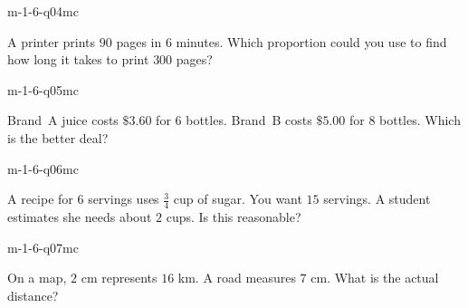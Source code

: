 \begin{practiceQuestion}{m-1-6-q04}{mc}
\begin{questionText}
A printer prints $90$ pages in $6$ minutes. Which proportion could you use to find how long it takes to print $300$ pages?
\end{questionText}
\end{practiceQuestion}

\begin{practiceQuestion}{m-1-6-q05}{mc}
\begin{questionText}
Brand~A juice costs $\$3.60$ for $6$ bottles. Brand~B costs $\$5.00$ for $8$ bottles. Which is the better deal?
\end{questionText}
\end{practiceQuestion}

\begin{practiceQuestion}{m-1-6-q06}{mc}
\begin{questionText}
A recipe for $6$ servings uses $\frac{3}{4}$ cup of sugar. You want $15$ servings. A student estimates she needs about $2$ cups. Is this reasonable?
\end{questionText}
\end{practiceQuestion}

\begin{practiceQuestion}{m-1-6-q07}{mc}
\begin{questionText}
On a map, $2$ cm represents $16$ km. A road measures $7$ cm. What is the actual distance?
\end{questionText}
\end{practiceQuestion}

